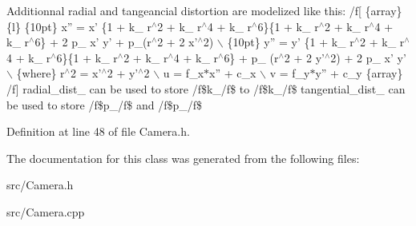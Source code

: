 Additionnal radial and tangeancial distortion are modelized like this: /f\mbox{[} \{array\}\{l\} \{10pt\} x'' = x' \{1 + k\_ r$^\wedge$2 + k\_ r$^\wedge$4 + k\_ r$^\wedge$6\}\{1 + k\_ r$^\wedge$2 + k\_ r$^\wedge$4 + k\_ r$^\wedge$6\} + 2 p\_ x' y' + p\_(r$^\wedge$2 + 2 x'$^\wedge$2) $\backslash$ \{10pt\} y'' = y' \{1 + k\_ r$^\wedge$2 + k\_ r$^\wedge$4 + k\_ r$^\wedge$6\}\{1 + k\_ r$^\wedge$2 + k\_ r$^\wedge$4 + k\_ r$^\wedge$6\} + p\_ (r$^\wedge$2 + 2 y'$^\wedge$2) + 2 p\_ x' y' $\backslash$ \{where\}  r$^\wedge$2 = x'$^\wedge$2 + y'$^\wedge$2 $\backslash$ u = f\_\-x$\ast$x'' + c\_\-x $\backslash$ v = f\_\-y$\ast$y'' + c\_\-y \{array\} /f\mbox{]} radial\_\-dist\_\- can be used to store /f\$k\_/f\$ to /f\$k\_/f\$ tangential\_\-dist\_\- can be used to store /f\$p\_/f\$ and /f\$p\_/f\$ 

Definition at line 48 of file Camera.h.



The documentation for this class was generated from the following files:\begin{DoxyCompactItemize}
\item 
src/Camera.h\item 
src/Camera.cpp\end{DoxyCompactItemize}
